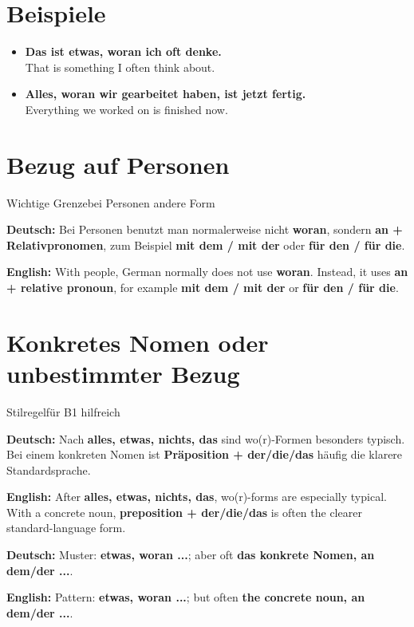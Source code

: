 \documentclass[a4paper,11pt]{article}
\newcommand{\GermanText}[1]{\textbf{Deutsch: }#1\par}
\newcommand{\EnglishText}[1]{{\small\color{SoftGray}\textbf{English: }#1\par}}
\newcommand{\ExampleItem}[2]{\item \textbf{#1}\\{\small\color{SoftGray}#2}}
\begin{document}
\section{Beispiele}

\begin{exbox}

\begin{itemize}

\ExampleItem{Das ist etwas, woran ich oft denke.}{That is something I often think about.}

\ExampleItem{Alles, woran wir gearbeitet haben, ist jetzt fertig.}{Everything we worked on is finished now.}

\end{itemize}

\end{exbox}

\section{Bezug auf Personen}

\begin{grammarentry}{Wichtige Grenze}{bei Personen andere Form}

\GermanText{Bei Personen benutzt man normalerweise nicht \textbf{woran}, sondern \textbf{an + Relativpronomen}, zum Beispiel \textbf{mit dem / mit der} oder \textbf{für den / für die}.}

\EnglishText{With people, German normally does not use \textbf{woran}. Instead, it uses \textbf{an + relative pronoun}, for example \textbf{mit dem / mit der} or \textbf{für den / für die}.}

\end{grammarentry}

\section{Konkretes Nomen oder unbestimmter Bezug}

\begin{grammarentry}{Stilregel}{für B1 hilfreich}

\GermanText{Nach \textbf{alles, etwas, nichts, das} sind wo(r)-Formen besonders typisch. Bei einem konkreten Nomen ist \textbf{Präposition + der/die/das} häufig die klarere Standardsprache.}

\EnglishText{After \textbf{alles, etwas, nichts, das}, wo(r)-forms are especially typical. With a concrete noun, \textbf{preposition + der/die/das} is often the clearer standard-language form.}

\GermanText{Muster: \textbf{etwas, woran ...}; aber oft \textbf{das konkrete Nomen, an dem/der ...}.}

\EnglishText{Pattern: \textbf{etwas, woran ...}; but often \textbf{the concrete noun, an dem/der ...}.}

\end{grammarentry}
\end{document}
